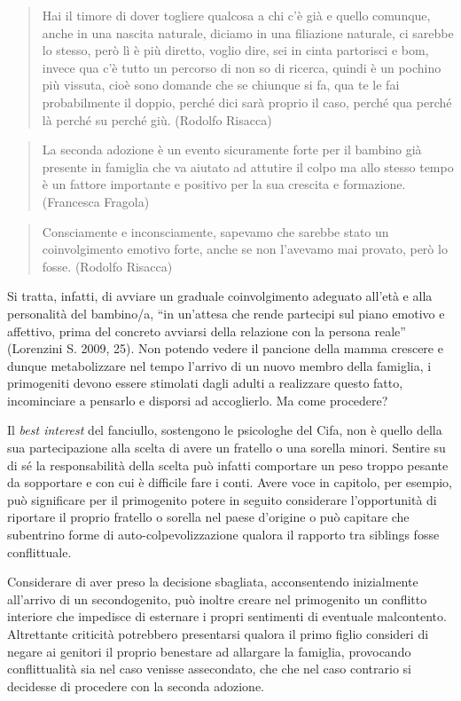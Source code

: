 \documentclass[12pt,oneside,svgnames]{memoir}
\newenvironment{quotationb}%
{\color{maincolor}\begin{leftbar}\begin{quotation}}%
{\end{quotation}\end{leftbar}\ignorespacesafterend}
\begin{document}
\begin{quotationb}
Hai il timore di dover togliere qualcosa a chi c'è già e quello
comunque, anche in una nascita naturale, diciamo in una filiazione
naturale, ci sarebbe lo stesso, però lì è più diretto, voglio dire, sei
in cinta partorisci e bom, invece qua c'è tutto un percorso di non so di
ricerca, quindi è un pochino più vissuta, cioè sono domande che se
chiunque si fa, qua te le fai probabilmente il doppio, perché dici sarà
proprio il caso, perché qua perché là perché su perché giù. (Rodolfo
Risacca)
\end{quotationb}

\begin{quotationb}
La seconda adozione è un evento sicuramente forte per il bambino già
presente in famiglia che va aiutato ad attutire il colpo ma allo stesso
tempo è un fattore importante e positivo per la sua crescita e
formazione. (Francesca Fragola)
\end{quotationb}

\begin{quotationb}
Consciamente e inconsciamente, sapevamo che sarebbe stato un
coinvolgimento emotivo forte, anche se non l'avevamo mai provato, però
lo fosse. (Rodolfo Risacca)
\end{quotationb}

Si tratta, infatti, di avviare un graduale coinvolgimento adeguato
all'età e alla personalità del bambino/a, ``in un'attesa che rende
partecipi sul piano emotivo e affettivo, prima del concreto avviarsi
della relazione con la persona reale'' (Lorenzini S. 2009, 25). Non
potendo vedere il pancione della mamma crescere e dunque metabolizzare
nel tempo l'arrivo di un nuovo membro della famiglia, i primogeniti
devono essere stimolati dagli adulti a realizzare questo fatto,
incominciare a pensarlo e disporsi ad accoglierlo. Ma come procedere?

Il \emph{best interest} del fanciullo, sostengono le psicologhe del
Cifa, non è quello della sua partecipazione alla scelta di avere un
fratello o una sorella minori. Sentire su di sé la responsabilità della
scelta può infatti comportare un peso troppo pesante da sopportare e con
cui è difficile fare i conti. Avere voce in capitolo, per esempio, può
significare per il primogenito potere in seguito considerare
l'opportunità di riportare il proprio fratello o sorella nel paese
d'origine o può capitare che subentrino forme di auto-colpevolizzazione
qualora il rapporto tra siblings fosse conflittuale.

Considerare di aver preso la decisione sbagliata, acconsentendo
inizialmente all'arrivo di un secondogenito, può inoltre creare nel
primogenito un conflitto interiore che impedisce di esternare i propri
sentimenti di eventuale malcontento. Altrettante criticità potrebbero
presentarsi qualora il primo figlio consideri di negare ai genitori il
proprio benestare ad allargare la famiglia, provocando conflittualità
sia nel caso venisse assecondato, che che nel caso contrario si
decidesse di procedere con la seconda adozione.
\end{document}
